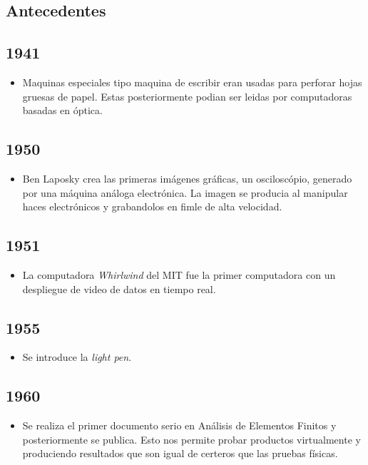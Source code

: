 \documentclass[letterpaper, 12pt]{article}
\begin{document}
    \newpage
    \begin{justify}
        \thispagestyle{empty}
        \justify
        \section*{Antecedentes}
        \justify
        \subsection*{1941}
        \begin{itemize}
            \item Maquinas especiales tipo maquina de escribir eran usadas para perforar hojas gruesas de papel. Estas posteriormente podian ser leidas por computadoras basadas en óptica.
        \end{itemize}
        \subsection*{1950}
        \begin{itemize}
            \item Ben Laposky crea las primeras imágenes gráficas, un osciloscópio, generado por una máquina análoga electrónica. La imagen se producia al manipular haces electrónicos y grabandolos en fimle de alta velocidad.
        \end{itemize}
        \subsection*{1951}
        \begin{itemize}
            \item La computadora \emph{Whirlwind} del MIT fue la primer computadora con un despliegue de video de datos en tiempo real.
        \end{itemize}
        \subsection*{1955}
        \begin{itemize}
            \item Se introduce la \emph{light pen}.
        \end{itemize}
        \subsection*{1960}
        \begin{itemize}
            \item Se realiza el primer documento serio en Análisis de Elementos Finitos y posteriormente se publica. Esto nos permite probar productos virtualmente y produciendo resultados que son igual de certeros que las pruebas físicas.
        \end{itemize}

\end{justify}
\end{document}
